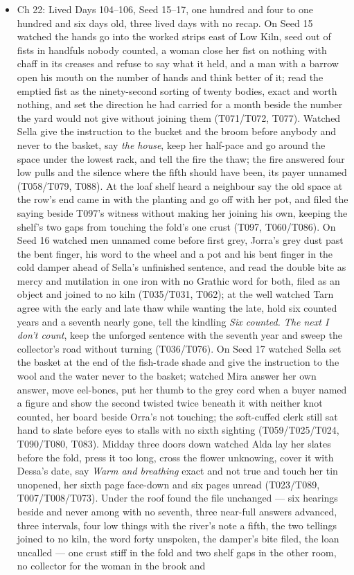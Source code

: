 \documentclass{design/chronicle}
\begin{document}
{\begin{itemize}[leftmargin=1.4em,itemsep=1pt,topsep=3pt,parsep=0pt]

\item Ch 22: Lived Days 104–106, Seed 15–17, one hundred and four to one hundred and six days old, three lived days with no recap. On Seed 15 watched the hands go into the worked strips east of Low Kiln, seed out of fists in handfuls nobody counted, a woman close her fist on nothing with chaff in its creases and refuse to say what it held, and a man with a barrow open his mouth on the number of hands and think better of it; read the emptied fist as the ninety-second sorting of twenty bodies, exact and worth nothing, and set the direction he had carried for a month beside the number the yard would not give without joining them (T071/T072, T077). Watched Sella give the instruction to the bucket and the broom before anybody and never to the basket, say \emph{the house}, keep her half-pace and go around the space under the lowest rack, and tell the fire the thaw; the fire answered four low pulls and the silence where the fifth should have been, its payer unnamed (T058/T079, T088). At the loaf shelf heard a neighbour say the old space at the row’s end came in with the planting and go off with her pot, and filed the saying beside T097’s witness without making her joining his own, keeping the shelf’s two gaps from touching the fold’s one crust (T097, T060/T086). On Seed 16 watched men unnamed come before first grey, Jorra’s grey dust past the bent finger, his word to the wheel and a pot and his bent finger in the cold damper ahead of Sella’s unfinished sentence, and read the double bite as mercy and mutilation in one iron with no Grathic word for both, filed as an object and joined to no kiln (T035/T031, T062); at the well watched Tarn agree with the early and late thaw while wanting the late, hold six counted years and a seventh nearly gone, tell the kindling \emph{Six counted. The next I don’t count}, keep the unforged sentence with the seventh year and sweep the collector’s road without turning (T036/T076). On Seed 17 watched Sella set the basket at the end of the fish-trade shade and give the instruction to the wool and the water never to the basket; watched Mira answer her own answer, move eel-bones, put her thumb to the grey cord when a buyer named a figure and show the second twisted twice beneath it with neither knot counted, her board beside Orra’s not touching; the soft-cuffed clerk still sat hand to slate before eyes to stalls with no sixth sighting (T059/T025/T024, T090/T080, T083). Midday three doors down watched Alda lay her slates before the fold, press it too long, cross the flower unknowing, cover it with Dessa’s date, say \emph{Warm and breathing} exact and not true and touch her tin unopened, her sixth page face-down and six pages unread (T023/T089, T007/T008/T073). Under the roof found the file unchanged — six hearings beside and never among with no seventh, three near-full answers advanced, three intervals, four low things with the river’s note a fifth, the two tellings joined to no kiln, the word forty unspoken, the damper’s bite filed, the loan uncalled — one crust stiff in the fold and two shelf gaps in the other room, no collector for the woman in the brook and 
\end{itemize}}
\end{document}
